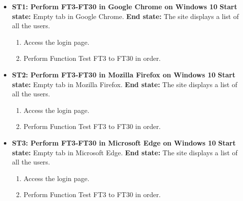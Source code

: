 \documentclass{article}
\begin{document}
\begin{itemize}
		\item \textbf{ST1: Perform FT3-FT30 in Google Chrome on Windows 10} \newline
		\textbf{Start state:} Empty tab in Google Chrome.  \newline
		\textbf{End state:} The site displays a list of all the users.
		\begin{enumerate}
			\item Access the login page.
			\item Perform Function Test FT3 to FT30 in order. 
		\end{enumerate}
		
	\item \textbf{ST2: Perform FT3-FT30 in Mozilla Firefox on Windows 10} \newline
		\textbf{Start state:} Empty tab in  Mozilla Firefox.  \newline
		\textbf{End state:} The site displays a list of all the users.
		\begin{enumerate}
			\item Access the login page.
			\item Perform Function Test FT3 to FT30 in order. 
		\end{enumerate}
		
		\item \textbf{ST3: Perform FT3-FT30 in Microsoft Edge on Windows 10} \newline
		\textbf{Start state:} Empty tab in Microsoft Edge.  \newline
		\textbf{End state:} The site displays a list of all the users.
		\begin{enumerate}
			\item Access the login page.
			\item Perform Function Test FT3 to FT30 in order. 
		\end{enumerate}

\end{itemize}
		
\end{document}
